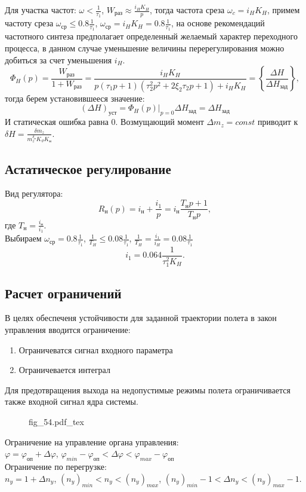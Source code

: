 \documentclass{article}
\newcommand{\incfig}[1]{
    {#1.pdf_tex}
}
\begin{document}
Для участка частот:
$\omega < \frac{1}{\tau_1}$, $W_\text{раз} \approx \frac{i_H K_H }{p} $, тогда частота среза $\omega_c = i_H  K_H$, примем частоту среза $\omega_\text{ср} \le  0.8 \frac{1}{\tau_1}$, $\omega_\text{ср} = i_H K_H =0.8 \frac{1}{\tau_1} $, на основе рекомендаций частотного синтеза предполагает определенный желаемый характер переходного процесса, в данном случае уменьшение величины перерегулирования можно добиться за счет уменьшения $i_H$. 
\[
	\Phi_H (p) =\frac{W_\text{раз}}{1 + W_\text{раз}} =\frac{i_H K_H}{p(\tau_1 p +1)(\tau_2^2 p^2 + 2 \xi_2 \tau_2 p + 1) + i_H K_H} = \left\{ \frac{\Delta H}{\Delta H_\text{зад}} \right\},
\]
тогда берем установившееся значение:
\[
	(\Delta H)_\text{уст} = \Phi_H(p)|_{p=0} \Delta H_\text{зад} = \Delta H_\text{зад}
\]
И статическая ошибка равна 0. Возмущающий момент $\Delta m_z = const$ приводит к $\delta H =\frac{\delta m_z}{m_z^{\delta_\text{н}} K_\vartheta K_\text{н}}$.

\subsection{Астатическое регулирование}
Вид регулятора:
\[
	R_\text{н}(p) = i_\text{н} +\frac{i_1}{p}  = i_\text{н} \frac{T_\text{н} p  + 1}{T_\text{н} p},
\]
где $T_\text{н} =\frac{i_\text{н}}{i_1}$.\\
Выбираем $\omega_\text{ср} = 0.8 \frac{1}{\tau_1}$, $\frac{1}{T_H} \le 0.08\frac{1}{\tau_1}$, $\frac{1}{T_H} = \frac{i_1}{i_H} = 0.08\frac{1}{\tau_1}$
\[
	i_1 = 0.064 \frac{1}{\tau_1^2 K_H}
	.\]

\subsection{Расчет ограничений}
В целях обеспеченя устойчивости для заданной траектории полета в закон управления вводится ограничение:
\begin{enumerate}
	\item Ограничеватся сигнал входного параметра
	\item Ограничевается интеграл
\end{enumerate}

Для предотвращения выхода на недопустимые режимы полета ограничивается также входной сигнал ядра системы.
\begin{figure}[H]
	\centering
	\incfig{fig_54}
	\label{fig:fig_54}
\end{figure}

Ограничение на управление органа управления:\\
$\varphi = \varphi_\text{оп} + \Delta \varphi$, $\varphi_{min} - \varphi_\text{оп} < \Delta \varphi < \varphi_{max} - \varphi_\text{оп}$\\
Ограничение по перегрузке:\\
$n_y = 1 + \Delta n_y$, $(n_y)_{min} < n_y < (n_y)_{max}$, $(n_y)_{min} - 1 < \Delta n_y < (n_y)_{max} - 1$.  
\end{document}
